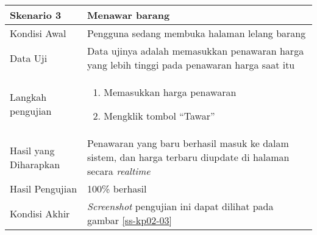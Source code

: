 \begin{longtable}{|X|X|}
		
	\textbf{Skenario 3}
		& Menawar barang \\ \hline
	Kondisi Awal
		& Pengguna sedang membuka halaman lelang barang \\ \hline
	Data Uji
		& Data ujinya adalah memasukkan penawaran harga yang lebih tinggi pada penawaran harga saat itu \\ \hline
	Langkah pengujian
		& \begin{enumerate}
		\item Memasukkan harga penawaran
		\item Mengklik tombol ``Tawar''
	\end{enumerate} \\ \hline
	Hasil yang Diharapkan
		& Penawaran yang baru berhasil masuk ke dalam sistem, dan harga terbaru diupdate di halaman secara \textit{realtime} \\ \hline
	Hasil Pengujian
		& 100\% berhasil \\ \hline	
	Kondisi Akhir
		& \textit{Screenshot} pengujian ini dapat dilihat pada gambar \ref{ss-kp02-03}  \\ \hline	
		
\end{longtable}